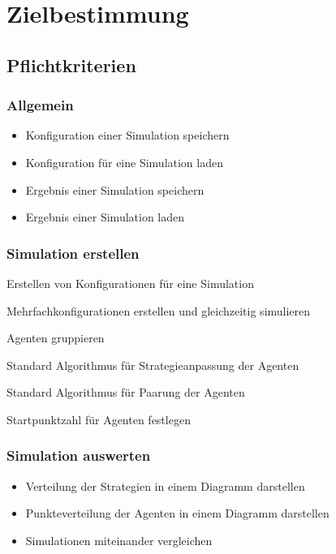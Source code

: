 \section{Zielbestimmung}

\subsection{Pflichtkriterien}

\subsubsection{Allgemein}
{\color{red}
\begin{itemize}
\item Konfiguration einer Simulation speichern
\item Konfiguration für eine Simulation laden
\item Ergebnis einer Simulation speichern
\item Ergebnis einer Simulation laden
\end{itemize}
}

\subsubsection{Simulation erstellen}

\begin{itemize}
\item Erstellen von Konfigurationen für eine Simulation
{\color{red}
\item Mehrfachkonfigurationen erstellen und gleichzeitig simulieren
}
\item Agenten gruppieren
{\color{red}
\item Standard Algorithmus für Strategieanpassung der Agenten
\item Standard Algorithmus für Paarung der Agenten 
\item Startpunktzahl für Agenten festlegen
}
\end{itemize}


\subsubsection{Simulation auswerten}
\begin{itemize}
\item Verteilung der Strategien in einem Diagramm darstellen
\item Punkteverteilung der Agenten in einem Diagramm darstellen
\item Simulationen miteinander vergleichen
\end{itemize}

